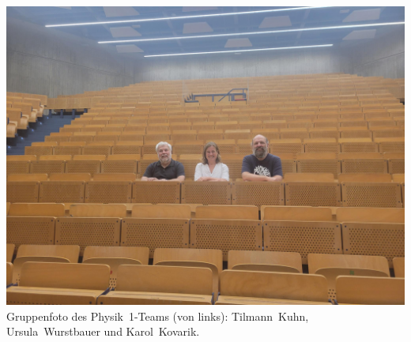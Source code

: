 \begin{center}
\includegraphics[width=columnwidth, height=0.4\textheight]{res/ProfsWS2025.jpg}\\
\smallskip
Gruppenfoto des Physik~1-Teams (von links): Tilmann~Kuhn, Ursula~Wurstbauer und Karol~Kovarik.
\end{center}










\newpage

